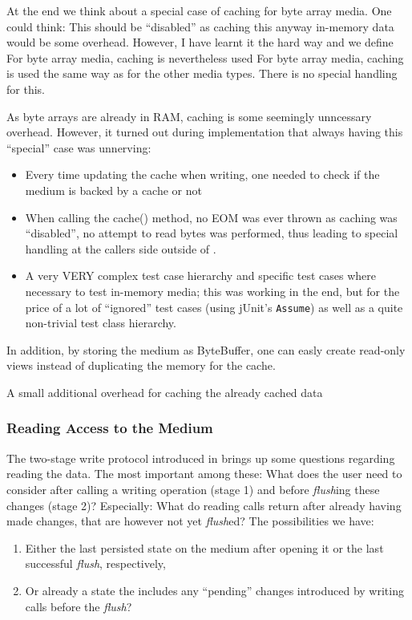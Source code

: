 At the end we think about a special case of caching for byte array media. One could think: This should be ``disabled'' as caching this anyway in-memory data would be some overhead. However, I have learnt it the hard way and we define 
{%
For byte array media, caching is nevertheless used
}
{%
For byte array media, caching is used the same way as for the other media types. There is no special handling for this.
}
{%
  As byte arrays are already in RAM, caching is some seemingly unncessary overhead. However, it turned out during implementation that always having this ``special'' case was unnerving:
  \begin{itemize}
  \item Every time updating the cache when writing, one needed to check if the medium is backed by a cache or not
  \item When calling the cache() method, no EOM was ever thrown as caching was ``disabled'', no attempt to read bytes was performed, thus leading to special handling at the callers side outside of \COMPmedia{}.
  \item A very VERY complex test case hierarchy and specific test cases where necessary to test in-memory media; this was working in the end, but for the price of a lot of ``ignored'' test cases (using jUnit's \texttt{Assume}) as well as a quite non-trivial test class hierarchy.
  \end{itemize}

  In addition, by storing the medium as ByteBuffer, one can easly create read-only views instead of duplicating the memory for the cache.
}
{%
A small additional overhead for caching the already cached data
}


\subsubsection{Reading Access to the Medium}%
\label{sec:LesenderZugriffaufdasMedium}%

The two-stage write protocol introduced in  brings up some questions regarding reading the data. The most important among these: What does the user need to consider after calling a writing operation (stage 1) and before \emph{flush}ing these changes (stage 2)? Especially: What do reading calls return after already having made changes, that are however not yet \emph{flush}ed? The possibilities we have:
\begin{enumerate}
\item Either the last persisted state on the medium after opening it or the last successful \emph{flush}, respectively,
\item Or already a state the includes any ``pending'' changes introduced by writing calls before the \emph{flush}?
\end{enumerate}
 
